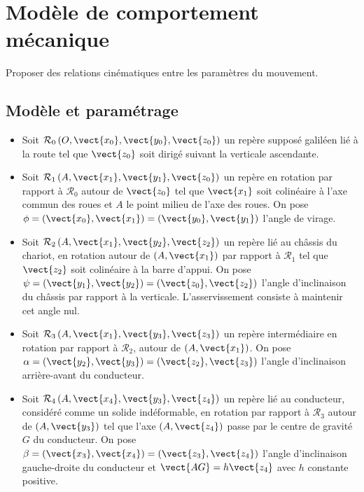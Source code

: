 \documentclass[10pt,fleqn]{article} %
\begin{document}
\section{Modèle de comportement mécanique}
\begin{obj}
Proposer des relations cinématiques entre les paramètres du mouvement.
\end{obj}

\subsection{Modèle et paramétrage}

\ifprof
\else

\begin{itemize}
\item Soit $\mathcal{R}_0\left(O,\vect{x_0},\vect{y_0},\vect{z_0} \right)$  un repère supposé galiléen lié à la route tel que $\vect{z_0}$ soit dirigé suivant la verticale ascendante.
\item Soit $\mathcal{R}_1\left(A,\vect{x_1},\vect{y_1},\vect{z_0} \right)$ un repère en rotation par rapport à $\mathcal{R}_0$  autour de $\vect{z_0}$  tel que $\vect{x_1}$ soit colinéaire à l’axe commun des roues et $A$ le point milieu de l’axe des roues. On pose $\phi=\left(\vect{x_0},\vect{x_1}\right)=\left(\vect{y_0},\vect{y_1}\right)$  l’angle de virage.
\item Soit $\mathcal{R}_2\left(A,\vect{x_1},\vect{y_2},\vect{z_2} \right)$ un repère lié au châssis du chariot, en rotation autour de $\left(A,\vect{x_1}\right)$ par rapport à  $\mathcal{R}_1$  tel que $\vect{z_2}$  soit colinéaire à la barre d’appui. On pose  $\psi=\left(\vect{y_1},\vect{y_2}\right)=\left(\vect{z_0},\vect{z_2}\right)$  l’angle d’inclinaison du châssis par rapport à la verticale. L’asservissement consiste à maintenir cet angle nul.
\item Soit $\mathcal{R}_3\left(A,\vect{x_1},\vect{y_3},\vect{z_3} \right)$ un repère intermédiaire en rotation par rapport à $\mathcal{R}_2$, autour de  $\left(A,\vect{x_1}\right)$. On pose $\alpha=\left(\vect{y_2},\vect{y_3}\right)=\left(\vect{z_2},\vect{z_3}\right)$ l’angle d’inclinaison arrière-avant du conducteur.
\item Soit $\mathcal{R}_4\left(A,\vect{x_4},\vect{y_3},\vect{z_4} \right)$ un repère lié au conducteur, considéré comme un solide indéformable, en rotation par rapport à $\mathcal{R}_3$ autour de $\left(A,\vect{y_3}\right)$ tel que l’axe $\left(A,\vect{z_4}\right)$ passe par le centre de gravité $G$ du conducteur. On pose $\beta=\left(\vect{x_3},\vect{x_4}\right)=\left(\vect{z_3},\vect{z_4}\right)$ l’angle d’inclinaison gauche-droite du conducteur et $\vect{AG}=h\vect{z_4}$ avec $h$ constante positive.

\end{itemize}
\end{document}
